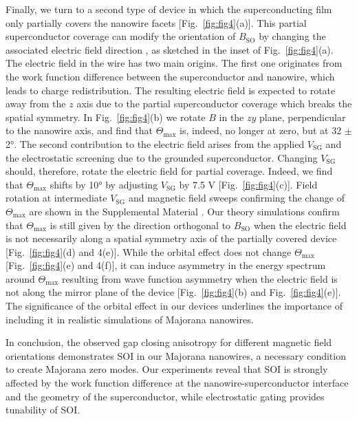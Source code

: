 Finally, we turn to a second type of device in which the superconducting film only partially covers the nanowire facets [Fig.~\ref{fig:fig4}(a)].  %
This partial superconductor coverage can modify the orientation of $B_{\mathrm{SO}}$ by changing the associated electric field direction \cite{Vuik2016}, as sketched in the inset of Fig.~\ref{fig:fig4}(a).  %
The electric field in the wire has two main origins.
The first one originates from the work function difference between the superconductor and nanowire, which leads to charge redistribution.
The resulting electric field is expected to rotate away from the $z$ axis due to the partial superconductor coverage which breaks the spatial symmetry.
In Fig.~\ref{fig:fig4}(b) we rotate $B$ in the $zy$ plane, perpendicular to the nanowire axis, and find that $\Theta_{\mathrm{max}}$ is, indeed, no longer at zero, but at 32 $\pm$ \ang{2}.  %
The second contribution to the electric field arises from the applied $V_{\mathrm{SG}}$ and the electrostatic screening due to the grounded superconductor.
Changing $V_{\mathrm{SG}}$ should, therefore, rotate the electric field for partial coverage.
Indeed, we find that $\Theta_{\mathrm{max}}$ shifts by \ang{10} by adjusting $V_{\mathrm{SG}}$ by 7.5 V [Fig.~\ref{fig:fig4}(c)].  %
Field rotation at intermediate $V_{\mathrm{SG}}$ and magnetic field sweeps confirming the change of $\Theta_{\mathrm{max}}$ are shown in the Supplemental Material \cite{Note1}.  %
Our theory simulations confirm that $\Theta_{\mathrm{max}}$ is still given by the direction orthogonal to $B_{\mathrm{SO}}$ when the electric field is not necessarily along a \mbox{spatial} symmetry axis of the partially covered device [Fig.~\ref{fig:fig4}(d) and 4(e)].  %
While the orbital effect does not change $\Theta_{\mathrm{max}}$ [Fig.~\ref{fig:fig4}(e) and 4(f)], it can induce asymmetry in the energy spectrum around $\Theta_{\mathrm{max}}$ resulting from wave function asymmetry when the electric field is not along the mirror plane of the device [Fig.~\ref{fig:fig4}(b) and Fig.~\ref{fig:fig4}(e)].  %
The significance of the orbital effect in our devices underlines the importance of including it in realistic simulations of Majorana nanowires.

In conclusion, the observed gap closing anisotropy for different magnetic field orientations demonstrates SOI in our Majorana nanowires, a necessary condition to create Majorana zero modes.
Our experiments reveal that SOI is strongly affected by the work function difference at the nanowire-superconductor interface and the geometry of the superconductor, while electrostatic gating provides tunability of SOI.


